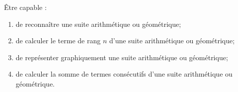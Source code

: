 \begin{myobj}
	Être capable : 
\begin{enumerate}
	\item de reconnaître une suite arithmétique ou géométrique;
	\item de calculer le terme de rang $n$ d'une suite arithmétique ou géométrique;
	\item de représenter graphiquement une suite arithmétique ou géométrique;
	\item de calculer la somme de termes consécutifs d'une suite arithmétique ou géométrique.
\end{enumerate}
\end{myobj}
